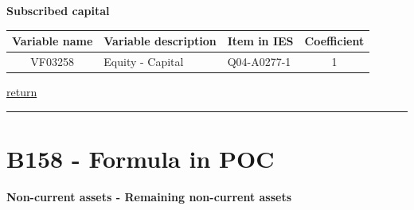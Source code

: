 \documentclass[]{book}
\begin{document}
\textbf{Subscribed capital}

\begin{longtable}[]{@{}cllc@{}}
\toprule
Variable name & Variable description & Item in IES & Coefficient\tabularnewline
\midrule
\endhead
VF03258 & Equity - Capital & Q04-A0277-1 & 1\tabularnewline
\bottomrule
\end{longtable}

\protect\hyperlink{equity}{return}

\begin{center}\rule{0.5\linewidth}{\linethickness}\end{center}

\hypertarget{b158---formula-in-poc}{%
\section{B158 - Formula in POC}\label{b158---formula-in-poc}}

\textbf{Non-current assets - Remaining non-current assets}
\end{document}
